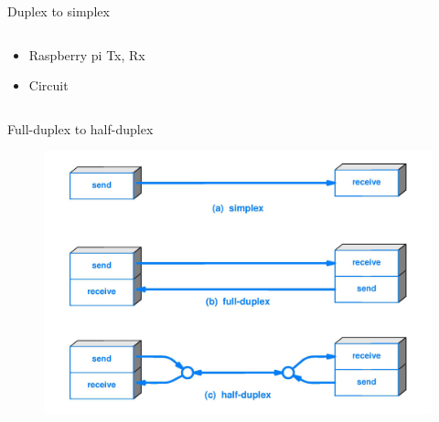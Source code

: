 \documentclass{beamer}
\begin{document}
\begin{frame}{Duplex to simplex}

    \begin{columns}
        \begin{column}[]{0.5\textwidth}
            \begin{itemize}
                \item Raspberry pi Tx, Rx
                \item Circuit
            \end{itemize}
        \end{column}
        
        
        \begin{column}[]{0.5\textwidth}
        \end{column}
    \end{columns}
    
\end{frame}



\begin{frame}{Full-duplex to half-duplex }

    \begin{figure}
        \centering
        \includegraphics[width = \textwidth]{img/BBE_Simplex vs Duplex_Transmissions.jpg}
        
    \end{figure}
    
\end{frame}


\end{document}
